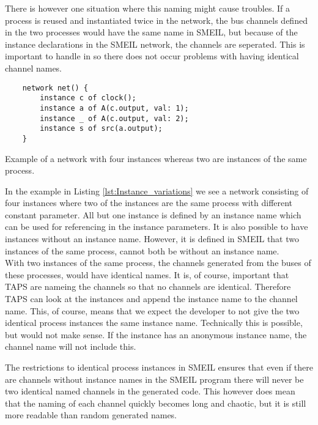 There is however one situation where this naming might cause troubles. If a process is reused and instantiated twice in the network, the bus channels defined in the two processes would have the same name in SMEIL, but because of the instance declarations in the SMEIL network, the channels are seperated. This is important to handle in \cspm{} so there does not occur problems with having identical channel names.

\begin{listing}
    \begin{verbatim}
    network net() {
        instance c of clock();
        instance a of A(c.output, val: 1);
        instance _ of A(c.output, val: 2);
        instance s of src(a.output);
    }
    \end{verbatim}
    \caption{Example of a network with four instances whereas two are instances of the same process.}
    \label{lst:Instance_variations}
\end{listing}
In the example in Listing \ref{lst:Instance_variations} we see a network consisting of four instances where two of the instances are the same process with different constant parameter.
All but one instance is defined by an instance name which can be used for referencing in the instance parameters. It is also possible to have instances without an instance name. However, it is defined in SMEIL that two instances of the same process, cannot both be without an instance name.\\

With two instances of the same process, the \cspm{} channels generated from the buses of these processes, would have identical names. It is, of course, important that TAPS are nameing the channels so that no \cspm{} channels are identical. Therefore TAPS can look at the instances and append the instance name to the \cspm{} channel name. This, of course, means that we expect the developer to not give the two identical process instances the same instance name. Technically this is possible, but would not make sense.
If the instance has an anonymous instance name, the \cspm{} channel name will not include this.

The restrictions to identical process instances in SMEIL ensures that even if there are channels without instance names in the SMEIL program there will never be two identical named \cspm{} channels in the generated code. This however does mean that the naming of each channel quickly becomes long and chaotic, but it is still more readable than random generated names.


